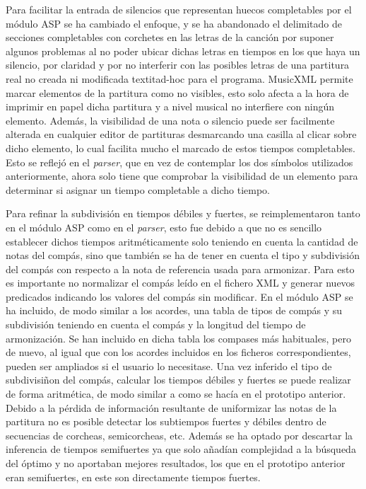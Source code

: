 Para facilitar la entrada de silencios que representan huecos completables por el módulo ASP se ha cambiado el enfoque, y se ha abandonado el delimitado de secciones completables con corchetes en las letras de la canción por suponer algunos problemas al no poder ubicar dichas letras en tiempos en los que haya un silencio, por claridad y por no interferir con las posibles letras de una partitura real no creada ni modificada textit{ad-hoc} para el programa. MusicXML permite marcar elementos de la partitura como no visibles, esto solo afecta a la hora de imprimir en papel dicha partitura y a nivel musical no interfiere con ningún elemento. Además, la visibilidad de una nota o silencio puede ser facilmente alterada en cualquier editor de partituras desmarcando una casilla al clicar sobre dicho elemento, lo cual facilita mucho el marcado de estos tiempos completables. Esto se reflejó en el \textit{parser}, que en vez de contemplar los dos símbolos utilizados anteriormente, ahora solo tiene que comprobar la visibilidad de un elemento para determinar si asignar un tiempo completable a dicho tiempo.

Para refinar la subdivisión en tiempos débiles y fuertes, se reimplementaron tanto en el módulo ASP como en el \textit{parser}, esto fue debido a que no es sencillo establecer dichos tiempos aritméticamente solo teniendo en cuenta la cantidad de notas del compás, sino que también se ha de tener en cuenta el tipo y subdivisión del compás con respecto a la nota de referencia usada para armonizar. Para esto es importante no normalizar el compás leído en el fichero XML y generar nuevos predicados indicando los valores del compás sin modificar. En el módulo ASP se ha incluido, de modo similar a los acordes, una tabla de tipos de compás y su subdivisión teniendo en cuenta el compás y la longitud del tiempo de armonización. Se han incluido en dicha tabla los compases más habituales, pero de nuevo, al igual que con los acordes incluidos en los ficheros correspondientes, pueden ser ampliados si el usuario lo necesitase. Una vez inferido el tipo de subdivisiñon del compás, calcular los tiempos débiles y fuertes se puede realizar de forma aritmética, de modo similar a como se hacía en el prototipo anterior. Debido a la pérdida de información resultante de uniformizar las notas de la partitura no es posible detectar los subtiempos fuertes y débiles dentro de secuencias de corcheas, semicorcheas, etc. Además se ha optado por descartar la inferencia de tiempos semifuertes ya que solo añadían complejidad a la búsqueda del óptimo y no aportaban mejores resultados, los que en el prototipo anterior eran semifuertes, en este son directamente tiempos fuertes.

